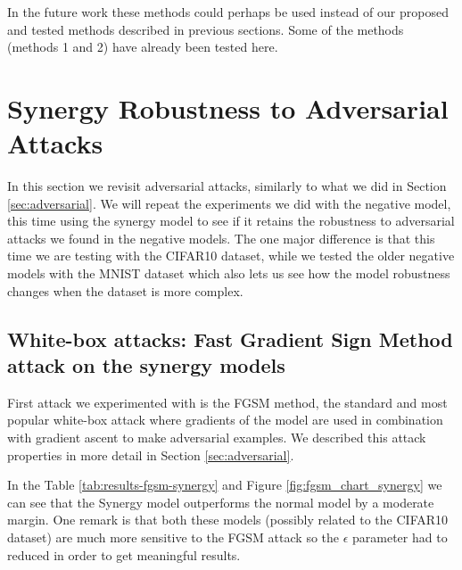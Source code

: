 \documentclass[b5paper]{book}
\begin{document}
In the future work these methods could perhaps be used instead of our proposed and tested methods described in previous sections. Some of the methods (methods 1 and 2) have already been tested here.

\section{Synergy Robustness to Adversarial Attacks}

In this section we revisit adversarial attacks, similarly to what we did in Section \ref{sec:adversarial}. We will repeat the experiments we did with the negative model, this time using the synergy model to see if it retains the robustness to adversarial attacks we found in the negative models. The one major difference is that this time we are testing with the CIFAR10 dataset, while we tested the older negative models with the MNIST dataset which also lets us see how the model robustness changes when the dataset is more complex.

\subsection{White-box attacks: Fast Gradient Sign Method attack on the synergy models}

First attack we experimented with is the FGSM method, the standard and most popular white-box attack where gradients of the model are used in combination with gradient ascent to make adversarial examples. We described this attack properties in more detail in Section \ref{sec:adversarial}. 

In the Table \ref{tab:results-fgsm-synergy} and Figure \ref{fig:fgsm_chart_synergy} we can see that the Synergy model outperforms the normal model by a moderate margin. One remark is that both these models (possibly related to the CIFAR10 dataset) are much more sensitive to the FGSM attack so the \(\epsilon\) parameter had to reduced in order to get meaningful results.
\end{document}
